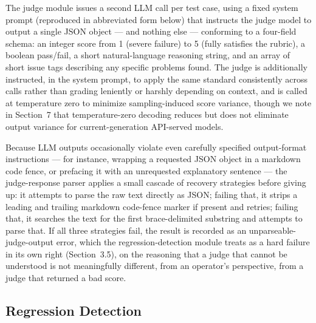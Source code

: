 \documentclass[11pt,a4paper]{article}
\begin{document}
The judge module issues a second LLM call per test case, using a fixed
system prompt (reproduced in abbreviated form below) that instructs the
judge model to output a single JSON object --- and nothing else ---
conforming to a four-field schema: an integer score from 1 (severe
failure) to 5 (fully satisfies the rubric), a boolean pass/fail, a short
natural-language reasoning string, and an array of short issue tags
describing any specific problems found. The judge is additionally
instructed, in the system prompt, to apply the same standard
consistently across calls rather than grading leniently or harshly
depending on context, and is called at temperature zero to minimize
sampling-induced score variance, though we note in Section~7 that
temperature-zero decoding reduces but does not eliminate output variance
for current-generation API-served models.

Because LLM outputs occasionally violate even carefully specified
output-format instructions --- for instance, wrapping a requested JSON
object in a markdown code fence, or prefacing it with an unrequested
explanatory sentence --- the judge-response parser applies a small
cascade of recovery strategies before giving up: it attempts to parse
the raw text directly as JSON; failing that, it strips a leading and
trailing markdown code-fence marker if present and retries; failing
that, it searches the text for the first brace-delimited substring and
attempts to parse that. If all three strategies fail, the result is
recorded as an unparseable-judge-output error, which the
regression-detection module treats as a hard failure in its own right
(Section~3.5), on the reasoning that a judge that cannot be understood
is not meaningfully different, from an operator's
perspective, from a judge that returned a bad score.

\subsection{Regression Detection}
\end{document}
